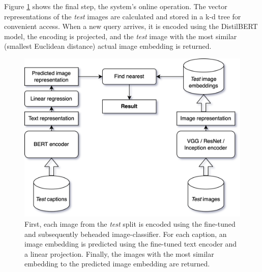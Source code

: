Figure \ref{fig:evaluate} shows the final step, the system's online operation. The vector representations of the \textit{test} images are calculated and stored in a k-d tree for convenient access. When a new query arrives, it is encoded using the DistilBERT model, the encoding is projected, and the \textit{test} image with the most similar (smallest Euclidean distance) actual image embedding is returned.
\begin{figure}
  \centering
  \includegraphics[width=1 \linewidth]{figures/evaluate.drawio.png}
  \caption{First, each image from the \textit{test} split is encoded using the fine-tuned and subsequently beheaded image-classifier. For each caption, an image embedding is predicted using the fine-tuned text encoder and a linear projection. Finally, the images with the most similar embedding to the predicted image embedding are returned.}
  \label{fig:evaluate}
\end{figure}
